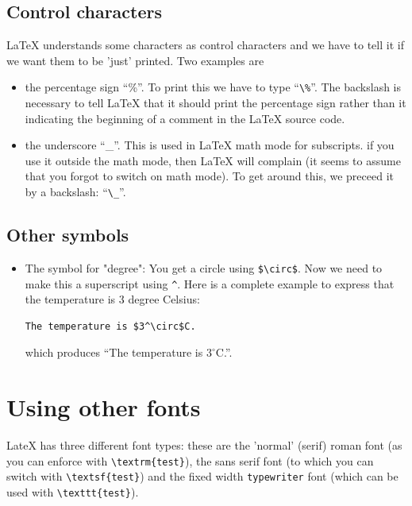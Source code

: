 \documentclass[12pt,a4paper]{article}
\begin{document}
\subsection{Control characters}

\LaTeX{} understands some characters as control characters and we have
to tell it if we want them to be 'just' printed. Two examples are
\begin{itemize}
\item the percentage sign ``\%''. To print this we have to type
  ``\verb:\%:''. The backslash is necessary to tell \LaTeX{} that it
  should print the percentage sign rather than it indicating the
  beginning of a comment in the \LaTeX{} source code.
\item the underscore ``\_''. This is used in \LaTeX{} math mode for
  subscripts. if you use it outside the math mode, then \LaTeX{} will
  complain (it seems to assume that you forgot to switch on math
  mode). To get around this, we preceed it by a backslash:
  ``\verb:\_:''.
\end{itemize}


\subsection{Other symbols}

\begin{itemize}

\item The symbol for "degree": You get a circle using
  \verb:$\circ$:. Now we need to make this a superscript using
  \verb:^:. Here is a complete example to express that the temperature
  is 3 degree Celsius:
\begin{verbatim}
The temperature is $3^\circ$C.
\end{verbatim}
which produces ``The temperature is $3^\circ$C.''.
\end{itemize}


\section{Using other fonts}\label{sec:useotherfonts}
\label{sec:using-other-fonts}

LateX has three different font types: these are the 'normal' (serif)
\textrm{roman} font (as you can enforce with \verb:\textrm{test}:),
the \textsf{sans serif} font (to which you can switch with
\verb:\textsf{test}:) and the fixed width \texttt{typewriter} font
(which can be used with \verb:\texttt{test}:).
\end{document}

